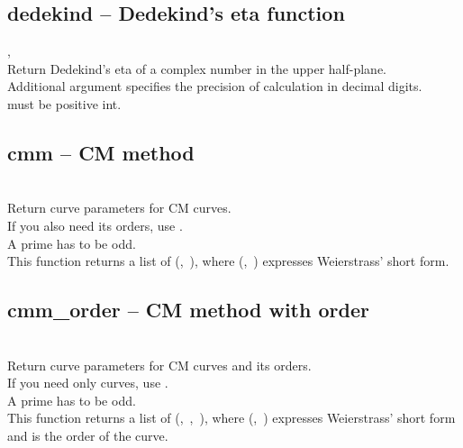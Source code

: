   \subsection{dedekind -- Dedekind's eta function}
        {, \ 
         }
        {}\\
   \spacing
   \quad Return Dedekind's eta of a complex number  in the upper half-plane. \\
   \spacing
   \quad Additional argument  specifies the precision of calculation in decimal digits.\\
   \spacing
   \quad {} must be positive int. \\
%
  \subsection{cmm -- CM method}
        {}
        {}\\
   \spacing
   \quad Return curve parameters for CM curves.\\
   \spacing
   \quad If you also need its orders, use .\\
   \spacing
   \quad A prime  has to be odd.\\
   This function returns a list of (,\ ), where (,\ ) expresses Weierstrass' short form.
%
  \subsection{cmm\_order -- CM method with order}
   \func{cmm\_order}
        {}
        {}\\
   \spacing
   \quad Return curve parameters for CM curves and its orders.\\
   \spacing
   \quad If you need only curves, use .\\
   \spacing
   \quad A prime  has to be odd.\\
   This function returns a list of (,\ ,\ ), where (,\ ) expresses Weierstrass' short form and  is the order of the curve.
%
